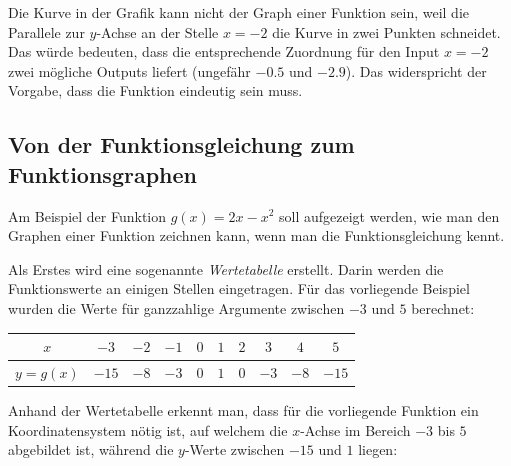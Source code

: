 Die Kurve in der Grafik kann nicht der Graph einer Funktion
sein, weil die Parallele zur \(y\)-Achse an der Stelle \(x=-2\)
die Kurve in zwei Punkten schneidet. Das würde bedeuten, dass die
entsprechende Zuordnung für den Input \(x=-2\) zwei mögliche
Outputs liefert (ungefähr \(-0.5\) und \(-2.9\)). Das widerspricht
der Vorgabe, dass die Funktion eindeutig sein muss.

\subsection*{Von der Funktionsgleichung zum Funktionsgraphen}

Am Beispiel der Funktion \(g(x)=2x-x^2\) soll aufgezeigt werden,
wie man den Graphen einer Funktion zeichnen kann, wenn man die
Funktionsgleichung kennt.

Als Erstes wird eine sogenannte \emph{Wertetabelle} erstellt.
Darin werden die Funktionswerte an einigen Stellen eingetragen.
Für das vorliegende Beispiel wurden die Werte für ganzzahlige
Argumente zwischen \(-3\) und \(5\) berechnet:

\begin{center}
    \renewcommand{\arraystretch}{1.5}
    \begin{tabular}{|c||*{9}{c|}}
        \hline
        \(x\)      & \(-3\)  & \(-2\) & \(-1\) & \(0\) & \(1\) & \(2\) & \(3\)  & \(4\)  & \(5\)   \\
        \hline
        \(y=g(x)\) & \(-15\) & \(-8\) & \(-3\) & \(0\) & \(1\) & \(0\) & \(-3\) & \(-8\) & \(-15\) \\
        \hline
    \end{tabular}
\end{center}

Anhand der Wertetabelle erkennt man, dass für die vorliegende
Funktion ein Koordinatensystem nötig ist, auf welchem die
\(x\)-Achse im Bereich \(-3\) bis \(5\) abgebildet ist,
während die \(y\)-Werte zwischen \(-15\) und \(1\) liegen:

\begin{center}
\end{center}

